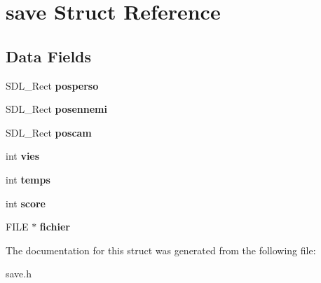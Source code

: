 \hypertarget{structsave}{}\section{save Struct Reference}
\label{structsave}
\subsection*{Data Fields}
\begin{DoxyCompactItemize}
\item 
\mbox{\label{structsave_a0c57ba62cb2556c435041b766398d6f4}} 
S\+D\+L\+\_\+\+Rect {\bfseries posperso}
\item 
\mbox{\label{structsave_a950c5e19a6cc5289b16c0ce885913aae}} 
S\+D\+L\+\_\+\+Rect {\bfseries posennemi}
\item 
\mbox{\label{structsave_ad915379ec11968effd8d89b92d082267}} 
S\+D\+L\+\_\+\+Rect {\bfseries poscam}
\item 
\mbox{\label{structsave_ae2c9f4bb2a8aea30342378169f3a6f63}} 
int {\bfseries vies}
\item 
\mbox{\label{structsave_add43f536fd076c8824e164a413927660}} 
int {\bfseries temps}
\item 
\mbox{\label{structsave_a9963249edd7dbf9c9d303faa18281a5a}} 
int {\bfseries score}
\item 
\mbox{\label{structsave_a6ae10d4be99d8f2c2063079c46feaac4}} 
F\+I\+LE $\ast$ {\bfseries fichier}
\end{DoxyCompactItemize}


The documentation for this struct was generated from the following file\+:\begin{DoxyCompactItemize}
\item 
save.\+h\end{DoxyCompactItemize}

